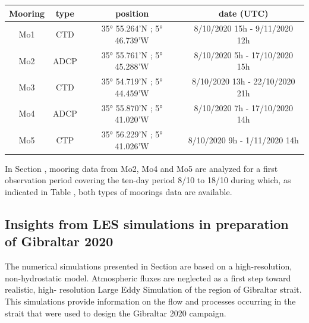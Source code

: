 \begin{table}[!h]
        \centering
        \begin{tabular}{|c|c|c|c|}
                \hline
                Mooring & type & position & date (UTC)\\ 
                 \hline
                Mo1 & CTD & 35° 55.264'N ; 5° 46.739'W & 8/10/2020 15h - 9/11/2020 12h\\
                Mo2 & ADCP & 35° 55.761'N ; 5° 45.288'W & 8/10/2020 5h - 17/10/2020 15h\\
                Mo3 & CTD & 35° 54.719'N ; 5° 44.459'W & 8/10/2020 13h - 22/10/2020 21h\\
                Mo4 & ADCP & 35° 55.870'N ; 5° 41.020'W & 8/10/2020 7h - 17/10/2020 14h\\
                Mo5 & CTP & 35° 56.229'N ; 5° 41.026'W & 8/10/2020 9h - 1/11/2020 14h\\
                \hline
        \end{tabular}
        \label{tab_moor}
\end{table}
In Section , mooring data from Mo2, Mo4 and Mo5 are analyzed for a first observation period covering the ten-day period 8/10 to 18/10 during which, as indicated in Table , both types of moorings data are available.


\subsection{Insights from LES simulations in preparation of Gibraltar 2020}

The numerical simulations presented in Section  are based on a high-resolution, non-hydrostatic model. Atmospheric fluxes are neglected as a first step toward realistic, high- resolution Large Eddy Simulation of the region of Gibraltar strait. This simulations provide information on the flow and processes occurring in the strait that were used to design the Gibraltar 2020 campaign.

